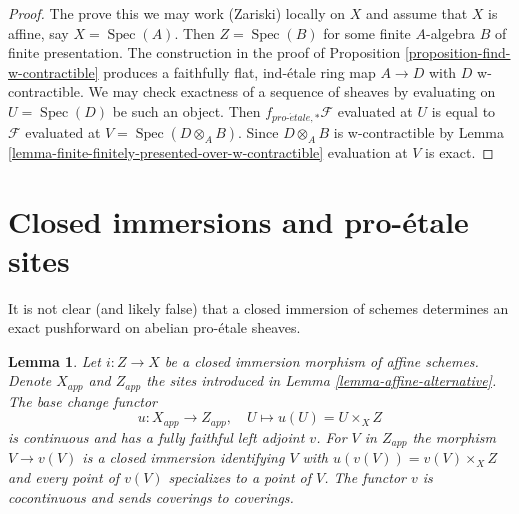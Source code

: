 \documentclass{stacks-project}
\theoremstyle{plain}
\newtheorem{lemma}[subsection]{Lemma}
\theoremstyle{definition}
\theoremstyle{remark}
\numberwithin{equation}{subsection}
\def\Spec{\mathop{\mathrm{Spec}}}
\def\proetale{{pro\text{-}\acute{e}tale}}
\begin{document}
\begin{proof}
The prove this we may work (Zariski) locally on $X$ and assume that $X$
is affine, say $X = \Spec(A)$. Then $Z = \Spec(B)$ for some finite
$A$-algebra $B$ of finite presentation. The construction in the proof of
Proposition \ref{proposition-find-w-contractible}
produces a faithfully flat, ind-\'etale ring map $A \to D$
with $D$ w-contractible. We may check exactness of a sequence of
sheaves by evaluating on $U = \Spec(D)$ be such an object. Then
$f_{\proetale, *}\mathcal{F}$
evaluated at $U$ is equal to $\mathcal{F}$ evaluated at
$V = \Spec(D \otimes_A B)$. Since $D \otimes_A B$ is w-contractible
by Lemma \ref{lemma-finite-finitely-presented-over-w-contractible}
evaluation at $V$ is exact.
\end{proof}








\section{Closed immersions and pro-\'etale sites}
\label{section-closed-immersion}

\noindent
It is not clear (and likely false) that a closed immersion of schemes
determines an exact pushforward on abelian pro-\'etale sheaves.

\begin{lemma}
\label{lemma-closed-immersion-affines}
Let $i : Z \to X$ be a closed immersion morphism of affine schemes.
Denote $X_{app}$ and $Z_{app}$ the sites introduced in
Lemma \ref{lemma-affine-alternative}.
The base change functor
$$
u : X_{app} \to Z_{app},\quad U \longmapsto u(U) = U \times_X Z
$$
is continuous and has a fully faithful left adjoint $v$.
For $V$ in $Z_{app}$ the morphism $V \to v(V)$ is a closed immersion
identifying $V$ with $u(v(V)) = v(V) \times_X Z$ and every point of
$v(V)$ specializes to a point of $V$.
The functor $v$ is cocontinuous and sends coverings to coverings.
\end{lemma}
\end{document}
